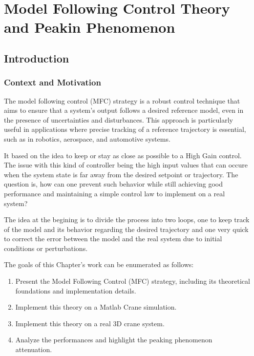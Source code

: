 \chapter{Model Following Control Theory and Peakin Phenomenon}


\section{Introduction}

\subsection{Context and Motivation}

The model following control (MFC) strategy is a robust control technique that aims to ensure that 
a system's output follows a desired reference model, even in the presence of uncertainties and disturbances. 
This approach is particularly useful in applications where precise tracking of a reference trajectory 
is essential, such as in robotics, aerospace, and automotive systems. 

It based on the idea to keep or stay as close as possible to a High Gain control. The issue with this 
kind of controller being the high input values that can occure when the system state is far away 
from the desired setpoint or trajectory. The question is, how can one prevent such behavior while still achieving good performance and maintaining a simple control law to implement on a real system?

The idea at the begining is to divide the process into two loops, one to keep track of the model and its behavior 
regarding the desired trajectory and one very quick to correct the error between the model and the real system 
due to initial conditions or perturbations.

The goals of this Chapter's work can be enumerated as follows:

\begin{enumerate}
    \item Present the Model Following Control (MFC) strategy, including its theoretical 
    foundations and implementation details.
    \item Implement this theory on a Matlab Crane simulation.
    \item Implement this theory on a real 3D crane system.
    \item Analyze the performances and highlight the peaking phenomenon attenuation.
\end{enumerate}

